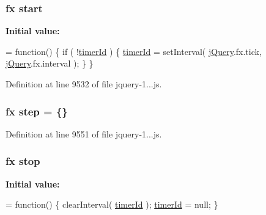 \subsubsection[{start}]{ {\bf fx} start}\label{_scripts_2jquery-1_810_82_8js_aef10902ffededd983608fdb8dbfc441a}
{\bfseries Initial value\+:}
\begin{DoxyCode}
= \textcolor{keyword}{function}() \{
    \textcolor{keywordflow}{if} ( !\hyperlink{obj_2_release_2_package_2_package_tmp_2_scripts_2jquery-1_810_82_8js_aa447439fbe7027e58837a297297c9d8a}{timerId} ) \{
        \hyperlink{obj_2_release_2_package_2_package_tmp_2_scripts_2jquery-1_810_82_8js_aa447439fbe7027e58837a297297c9d8a}{timerId} = setInterval( \hyperlink{obj_2_release_2_package_2_package_tmp_2_scripts_2jquery-1_810_82_8js_a5e01048fbd3a30b44e8d491d8945c457}{jQuery}.fx.tick, \hyperlink{obj_2_release_2_package_2_package_tmp_2_scripts_2jquery-1_810_82_8js_a5e01048fbd3a30b44e8d491d8945c457}{jQuery}.fx.interval );
    \}
\}
\end{DoxyCode}


Definition at line 9532 of file jquery-\/1...\+js.

\hypertarget{_scripts_2jquery-1_810_82_8js_a7337229078e935a813e7e0f674fad739}{}
\subsubsection[{step}]{ {\bf fx} step = \{\}}\label{_scripts_2jquery-1_810_82_8js_a7337229078e935a813e7e0f674fad739}


Definition at line 9551 of file jquery-\/1...\+js.

\hypertarget{_scripts_2jquery-1_810_82_8js_ac9a544302040b74e845b33c285cd10e7}{}
\subsubsection[{stop}]{ {\bf fx} stop}\label{_scripts_2jquery-1_810_82_8js_ac9a544302040b74e845b33c285cd10e7}
{\bfseries Initial value\+:}
\begin{DoxyCode}
= \textcolor{keyword}{function}() \{
    clearInterval( \hyperlink{obj_2_release_2_package_2_package_tmp_2_scripts_2jquery-1_810_82_8js_aa447439fbe7027e58837a297297c9d8a}{timerId} );
    \hyperlink{obj_2_release_2_package_2_package_tmp_2_scripts_2jquery-1_810_82_8js_aa447439fbe7027e58837a297297c9d8a}{timerId} = null;
\}
\end{DoxyCode}


